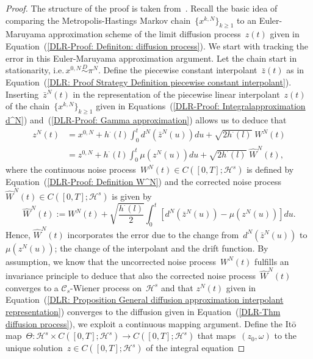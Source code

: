 \begin{proof}
  The structure of the proof is taken from~\autocite[Proposition 3.1]{Pillai2012}.  Recall the basic idea of comparing the Metropolis-Hastings Markov chain~$\{ x^{k,N} \}_{k \geq 1}$ to an Euler-Maruyama approximation scheme of the limit diffusion process~$z(t)$ given in Equation~(\ref{DLR-Proof: Definiton: diffusion process}). We start with tracking  the error in this Euler-Maruyama approximation argument. Let the chain start in stationarity, i.e.\,$x^{0,N} \stackrel{D}{\sim} \pi^N$. Define the piecewise constant interpolant~$\bar{z}(t)$ as in Equation~(\ref{DLR: Proof Strategy Definition piecewise constant interpolant}). Inserting~$\bar{z}^N(t)$ in the representation of the piecewise linear interpolant~$z(t)$ of the chain~$\{ x^{k,N} \}_{k \geq 1}$ given in Equations~(\ref{DLR-Proof: Integralapproximation d^N}) and~(\ref{DLR-Proof: Gamma approximation}) allows us to deduce that
  \begin{equation}
    \label{DLR: Proposition General diffusion approximation interpolant representation}
    \begin{split}
      z^N(t) & = x^{0,N} + h^{\cdot}(l) \int_0^t d^N(\bar{z}^N(u)) du + \sqrt{2 h^{\cdot}(l)} \; W^N(t) \\
      & = z^{0,N} + h^{\cdot}(l) \int_0^t \mu(z^N(u)) du + \sqrt{2 h^{\cdot}(l)} \;\widehat{W}^N(t),
    \end{split}
  \end{equation} 
  where the continuous noise process~$W^N(t) \in C([0,T]; \mathcal{H}^s)$ is defined by Equation~(\ref{DLR-Proof: Definition W^N}) and the corrected noise process~$\widehat{W}^N(t)\in C([0,T]; \mathcal{H}^s) $ is given by
  \begin{equation}
    \widehat{W}^N(t) :=  W^N(t) + \sqrt{\frac{h^{\cdot}(l)}{2}} \int_0^t [d^N(\bar{z}^N(u)) - \mu(z^N(u))] du.
  \end{equation}
  Hence, $\widehat{W}^N(t)$ incorporates the error due to the change from~$d^N(\bar{z}^N(u))$ to $\mu(z^N(u))$; the change of the interpolant and the drift function. By assumption, we know that the uncorrected noise process~$W^N(t)$ fulfills an invariance principle to deduce that also the corrected noise process~$\widehat{W}^N(t)$ converges to a $\mathcal{C}_s$-Wiener process on~$\mathcal{H}^s$ and that $z^N(t)$ given in Equation~(\ref{DLR: Proposition General diffusion approximation interpolant representation}) converges to the diffusion given in Equation~(\ref{DLR-Thm diffusion process}), we exploit a continuous mapping argument. Define the It\={o} map~$\Theta : \mathcal{H}^s \times C([0,T]; \mathcal{H}^s) \to  C([0,T]; \mathcal{H}^s)$ that maps~$(z_0, \omega) $ to the unique solution~$z \in  C([0,T]; \mathcal{H}^s)$ of the integral equation

\end{proof}
